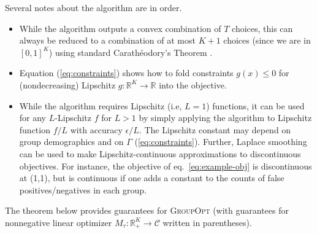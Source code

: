 \documentclass[final, 12pt]{colt2018} %
\def\reals{{\mathbb R}}
\newcommand{\eps}{\epsilon}
\def\calC{\mathcal{C}}
\begin{document}
Several notes about the algorithm are in order. 
\begin{itemize}
\item While the algorithm outputs a convex combination of $T$ choices, this can always be reduced to a combination of at most $K+1$ choices (since we are in $[0,1]^K$) using standard Carathéodory's Theorem \citep[see, e.g.,][]{mulzer2014computational}.

\item Equation (\ref{eq:constraints}) shows how to fold constraints $g(x) \leq 0$ for (nondecreasing) Lipschitz $g:\reals^K \rightarrow \reals$ into the objective. 

\item While the algorithm requires Lipschitz (i.e, $L=1$) functions, it can be used for any $L$-Lipschitz $f$ for $L>1$ by simply applying the algorithm to Lipschitz function $f/L$ with accuracy $\eps/L$. The Lipschitz constant may depend on group demographics and on $\Gamma$ (\ref{eq:constraints}).
Further, Laplace smoothing \citep[see, e.g.][]{schutze2008introduction} can be used to make Lipschitz-continuous approximations to discontinuous objectives. For instance, the objective of eq.~\ref{eq:example-obj} is discontinuous at (1,1), but is continuous if one adds a constant to the counts of false positives/negatives in each group.

\end{itemize}

The theorem below provides guarantees for \textsc{GroupOpt} (with guarantees for nonnegative linear optimizer $M_\tau:\reals_+^K \rightarrow \calC$ written in parentheses). 
\end{document}
